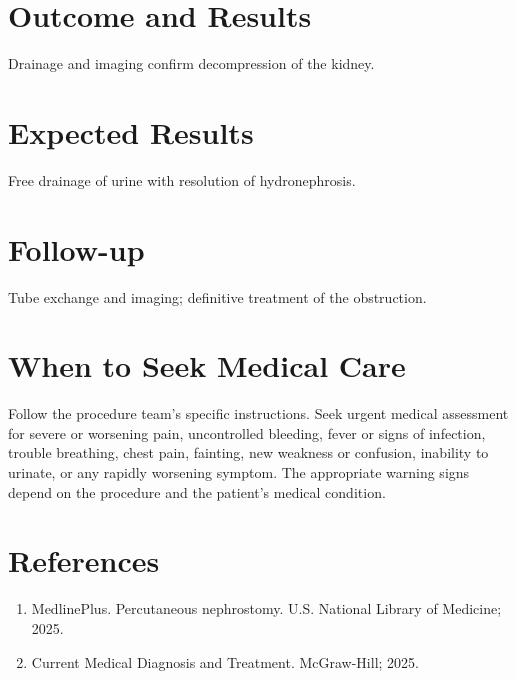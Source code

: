 \section*{Outcome and Results}
Drainage and imaging confirm decompression of the kidney.

\section*{Expected Results}
Free drainage of urine with resolution of hydronephrosis.

\section*{Follow-up}
Tube exchange and imaging; definitive treatment of the obstruction.

\section*{When to Seek Medical Care}
Follow the procedure team's specific instructions. Seek urgent medical assessment for severe or worsening pain, uncontrolled bleeding, fever or signs of infection, trouble breathing, chest pain, fainting, new weakness or confusion, inability to urinate, or any rapidly worsening symptom. The appropriate warning signs depend on the procedure and the patient's medical condition.

\section*{References}
\begin{enumerate}
  \item MedlinePlus. Percutaneous nephrostomy. U.S. National Library of Medicine; 2025.
  \item Current Medical Diagnosis and Treatment. McGraw-Hill; 2025.
\end{enumerate}

\clearpage
